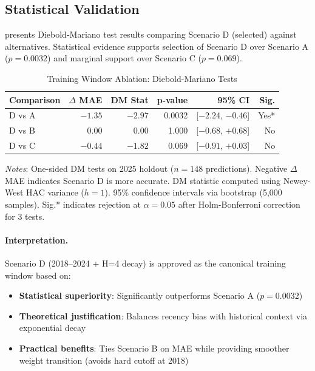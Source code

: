 \subsection{Statistical Validation}

 presents Diebold-Mariano test results comparing Scenario D (selected) against alternatives. Statistical evidence supports selection of Scenario D over Scenario A ($p=0.0032$) and marginal support over Scenario C ($p=0.069$).

\begin{table}[htbp]
  \centering
  \caption{Training Window Ablation: Diebold-Mariano Tests}
  \label{tab:training-window-dm-tests}
  \begin{tabular}{lrrrrr}
    \toprule
    \textbf{Comparison} & \textbf{$\Delta$ MAE} & \textbf{DM Stat} & \textbf{p-value} & \textbf{95\% CI} & \textbf{Sig.} \\
    \midrule
    D vs A & $-1.35$ & $-2.97$ & 0.0032 & [$-2.24$, $-0.46$] & Yes* \\
    D vs B & 0.00 & 0.00 & 1.000 & [$-0.68$, $+0.68$] & No \\
    D vs C & $-0.44$ & $-1.82$ & 0.069 & [$-0.91$, $+0.03$] & No \\
    \bottomrule
  \end{tabular}
  \vspace{0.5em}
  \begin{flushleft}
    \footnotesize\textit{Notes}: One-sided DM tests on 2025 holdout ($n=148$ predictions). Negative $\Delta$ MAE indicates Scenario D is more accurate. DM statistic computed using Newey-West HAC variance ($h=1$). 95\% confidence intervals via bootstrap (5,000 samples). Sig.* indicates rejection at $\alpha=0.05$ after Holm-Bonferroni correction for 3 tests.
  \end{flushleft}
\end{table}

\paragraph{Interpretation.}
Scenario D (2018--2024 + H=4 decay) is approved as the canonical training window based on:
\begin{itemize}
  \item \textbf{Statistical superiority}: Significantly outperforms Scenario A ($p=0.0032$)
  \item \textbf{Theoretical justification}: Balances recency bias with historical context via exponential decay
  \item \textbf{Practical benefits}: Ties Scenario B on MAE while providing smoother weight transition (avoids hard cutoff at 2018)
\end{itemize}

